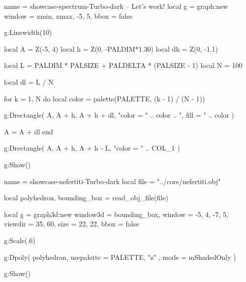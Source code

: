 \documentclass[theme = dark]{tutodoc}
\newcommand{\PALETTE}{Turbo}
\begin{document}
\begin{luadraw}{name = showcase-spectrum-\PALETTE-dark}
-- Let's work!
local g = graph:new{
  window = {xmin, xmax, -5, 5},
  bbox   = false
}

g:Linewidth(10)

local A  = Z(-5, 4)
local h  = Z(0, -PALDIM*1.30)
local dh = Z(0, -1.1)

local L = PALDIM * PALSIZE + PALDELTA * (PALSIZE - 1)
local N = 100

local dl = L / N

for k = 1, N do
  local color = palette(PALETTE, (k - 1) / (N - 1))

  g:Drectangle(
    A, A + h, A + h + dl,
    "color = " .. color .. ", fill = " .. color
  )

  A = A + dl
end

g:Drectangle(
  A, A + h, A + h - L,
  "color = " .. COL_1
)

g:Show()
\end{luadraw}



\vfill

\begin{luadraw}{name = showcase-nefertiti-\PALETTE-dark}
local file = "../core/nefertiti.obj"

local polyhedron, bounding_box = read_obj_file(file)

local g = graph3d:new{
  window3d = bounding_box,
  window   = {-5, 4, -7, 5},
  viewdir  = {35, 60},
  size     = {22, 22},
  bbox     = false
}

g:Scale(.6)

g:Dpoly(
  polyhedron,
  {
    usepalette = {PALETTE, "z" },
    mode       = mShadedOnly
  }
)

g:Show()
\end{luadraw}



\vfill
\end{document}
